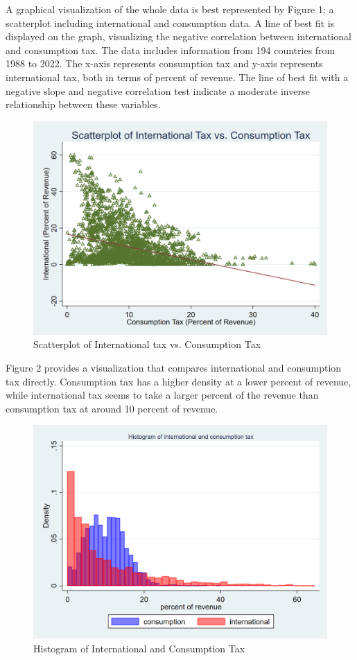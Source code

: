 \documentclass[12pt]{article}
\begin{document}
A graphical visualization of the whole data is best represented by Figure 1; a scatterplot including international and consumption data. A line of best fit is displayed on the graph, visualizing the negative correlation between international and consumption tax. The data includes information from 194 countries from 1988 to 2022. The x-axis represents consumption tax and y-axis represents international tax, both in terms of percent of revenue. The line of best fit with a negative slope and negative correlation test indicate a moderate inverse relationship between these variables. 

\begin{figure}[h]
    \centering
    \includegraphics[width=0.5\linewidth]{Reproducibility_Package//research_outputs/Scatterplotintvscons.png}
    \caption{Scatterplot of International tax vs. Consumption Tax}
    \label{fig:enter-label}
\end{figure}

Figure 2 provides a visualization that compares international and consumption tax directly. Consumption tax has a higher density at a lower percent of revenue, while international tax seems to take a larger percent of the revenue than consumption tax at around 10 percent of revenue. 

\begin{figure}[h]
    \centering
    \includegraphics[width=0.5\linewidth]{Reproducibility_Package//research_outputs/twowayhistintcons.png}
    \caption{Histogram of International and Consumption Tax}
    \label{fig:enter-label}
\end{figure}
\end{document}
